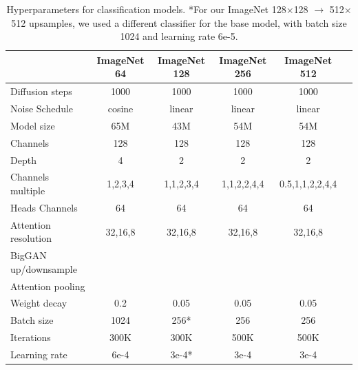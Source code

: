 \documentclass{article}
\newcommand{\cmark}{\ding{51}}%
\begin{document}
\begin{table}[h]
    \begin{center}
    \begin{small}
    \begin{tabular}{lccccc}
    \toprule
     & ImageNet 64 & ImageNet 128 & ImageNet 256 & ImageNet 512 \\
    \midrule
    Diffusion steps & 1000 & 1000 & 1000 & 1000 \\
    Noise Schedule & cosine & linear & linear & linear \\
    Model size & 65M & 43M & 54M & 54M \\
    Channels & 128 & 128 & 128 & 128 \\
    Depth & 4 & 2 & 2 & 2 \\
    Channels multiple & 1,2,3,4 & 1,1,2,3,4 & 1,1,2,2,4,4 & 0.5,1,1,2,2,4,4 \\
    Heads Channels & 64 & 64 & 64 & 64 \\
    Attention resolution & 32,16,8 & 32,16,8 & 32,16,8 & 32,16,8 \\
    BigGAN up/downsample & \cmark & \cmark & \cmark & \cmark \\
    Attention pooling & \cmark & \cmark & \cmark & \cmark \\
    Weight decay & 0.2 & 0.05 & 0.05 & 0.05 \\
    Batch size & 1024 & 256* & 256 & 256 \\
    Iterations & 300K & 300K & 500K & 500K \\
    Learning rate & 6e-4 & 3e-4* & 3e-4 & 3e-4 \\
    \bottomrule
    \end{tabular}
    \end{small}
    \end{center}
    \caption{Hyperparameters for classification models. *For our ImageNet 128$\times$128 $\to$ 512$\times$512 upsamples, we used a different classifier for the base model, with batch size 1024 and learning rate 6e-5.}
    \label{tab:hpscf}
    \vskip -0.2in
\end{table}
\end{document}

